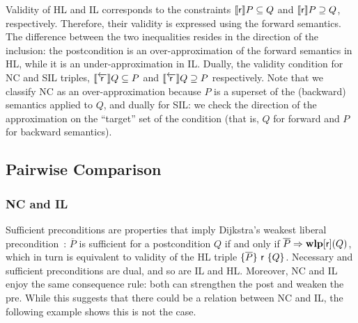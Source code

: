 Validity of HL and IL corresponds to the constraints $\llbracket\mathsf{r}\rrbracket P \subseteq Q$ and $\llbracket\mathsf{r}\rrbracket P \supseteq Q$, respectively. Therefore, their validity is expressed using the forward semantics. The difference between the two inequalities resides in the direction of the inclusion: the postcondition is an over-approximation of the forward semantics in HL, while it is an under-approximation in IL.
Dually, the validity condition for NC and SIL triples, $\llbracket\overleftarrow{\mathsf{r}}\rrbracket Q \subseteq P$ and $\llbracket\overleftarrow{\mathsf{r}}\rrbracket Q \supseteq P$ respectively. Note that we classify NC as an over-approximation because $P$ is a superset of the (backward) semantics applied to $Q$, and dually for SIL: we check the direction of the approximation on the ``target'' set of the condition (that is, $Q$ for forward and $P$ for backward semantics).

\subsection{Pairwise Comparison}
\subsubsection{NC and IL}
Sufficient preconditions are properties that imply Dijkstra's weakest liberal precondition~\cite{Dijkstra75}: $\overline{P}$ is sufficient for a postcondition $Q$ if and only if $\overline{P} \Rightarrow \textbf{wlp}[\mathsf{r}](Q)$, which in turn is equivalent to validity of the HL triple $\{\overline{P}\}~\mathsf{r}~\{Q\}$. Necessary and sufficient preconditions are dual, and so are IL and HL. Moreover, NC and IL enjoy the same consequence rule: both can strengthen the post and weaken the pre. While this suggests that there could be a relation between NC and IL, the following example shows this is not the case.

